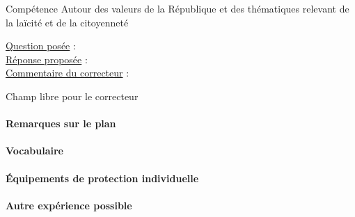 \begin{reportBlock}{Compétence \og Autour des valeurs de la République et des thématiques relevant de la laïcité et de la citoyenneté \fg{}}

\underline{Question posée} : \\

\underline{Réponse proposée} : \\ 

\underline{Commentaire du correcteur} : \\

\end{reportBlock}


\begin{reportBlock}{Champ libre pour le correcteur}

\paragraph*{Remarques sur le plan}


\paragraph*{Vocabulaire}

\paragraph*{Équipements de protection individuelle}

\paragraph*{Autre expérience possible} 

\end{reportBlock}